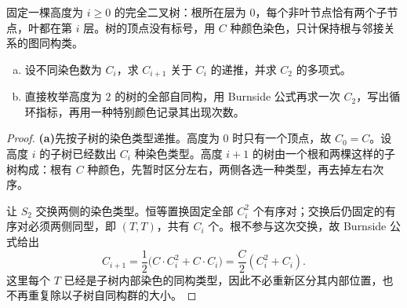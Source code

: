 \documentclass[lang=cn,a4paper,fontset=none,zihao=false,10pt,openany,twoside]{beautybook}
\numberwithin{algorithm}{chapter}
\begin{document}
\begin{example}[完全二叉树上的染色]\label{ex:complete-binary-tree-colours}
固定一棵高度为 $i\ge0$ 的完全二叉树：根所在层为 $0$，每个非叶节点恰有两个子节点，叶都在第 $i$ 层。树的顶点没有标号，用 $C$ 种颜色染色，只计保持根与邻接关系的图同构类。
\begin{enumerate}[(a)]
\item 设不同染色数为 $C_i$，求 $C_{i+1}$ 关于 $C_i$ 的递推，并求 $C_2$ 的多项式。
\item 直接枚举高度为 $2$ 的树的全部自同构，用 Burnside 公式再求一次 $C_2$，写出循环指标，再用一种特别颜色记录其出现次数。
\end{enumerate}
\end{example}
\begin{proof}
\par\smallskip\noindent\textbf{(a)}\quad 先按子树的染色类型递推。高度为 $0$ 时只有一个顶点，故 $C_0=C$。设高度 $i$ 的子树已经数出 $C_i$ 种染色类型。高度 $i+1$ 的树由一个根和两棵这样的子树构成：根有 $C$ 种颜色，先暂时区分左右，两侧各选一种类型，再去掉左右次序。

让 $S_2$ 交换两侧的染色类型。恒等置换固定全部 $C_i^2$ 个有序对；交换后仍固定的有序对必须两侧同型，即 $(T,T)$，共有 $C_i$ 个。根不参与这次交换，故 Burnside 公式给出
\[
 C_{i+1}=\frac12\bigl(C\cdot C_i^2+C\cdot C_i\bigr)
 =\frac C2(C_i^2+C_i).
\]
这里每个 $T$ 已经是子树内部染色的同构类型，因此不必重新区分其内部位置，也不再重复除以子树自同构群的大小。


\end{proof}
\end{document}
